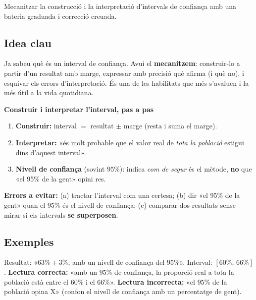 %
{Mecanitzar la construcció i la interpretació d'intervals de confiança amb una bateria graduada i correcció creuada.}

\subsection{Idea clau}

Ja sabeu què és un interval de confiança. Avui el \textbf{mecanitzem}: construir-lo a
partir d'un resultat amb marge, expressar amb precisió què afirma (i què no), i esquivar
els errors d'interpretació. És una de les habilitats que més s'avaluen i la més útil a la
vida quotidiana.

\begin{idea}
\textbf{Construir i interpretar l'interval, pas a pas}
\begin{enumerate}[leftmargin=1.6em, itemsep=2pt]
  \item \textbf{Construir:} interval $=$ resultat $\pm$ marge (resta i suma el marge).
  \item \textbf{Interpretar:} «és molt probable que el valor real de \emph{tota la
        població} estigui dins d'aquest interval».
  \item \textbf{Nivell de confiança} (sovint $95\%$): indica \emph{com de segur} és el
        mètode, \textbf{no} que «el 95\% de la gent» opini res.
\end{enumerate}
\textbf{Errors a evitar:} (a) tractar l'interval com una certesa; (b) dir «el 95\% de la
gent» quan el $95\%$ és el nivell de confiança; (c) comparar dos resultats sense mirar si
els intervals \textbf{se superposen}.
\end{idea}

\subsection{Exemples}

\begin{exemple}
Resultat: «$63\%\pm 3\%$, amb un nivell de confiança del $95\%$». Interval:
$[60\%,\,66\%]$. \textbf{Lectura correcta:} «amb un $95\%$ de confiança, la proporció real
a tota la població està entre el $60\%$ i el $66\%$». \textbf{Lectura incorrecta:} «el
$95\%$ de la població opina X» (confon el nivell de confiança amb un percentatge de gent).
\end{exemple}

